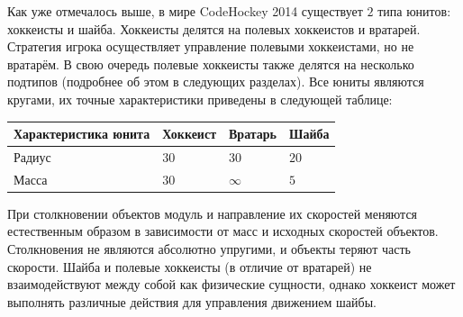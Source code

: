 Как уже отмечалось выше, в мире CodeHockey 2014 существует $2$ типа юнитов: хоккеисты и шайба. Хоккеисты делятся на полевых хоккеистов и
вратарей. Стратегия игрока осуществляет управление полевыми хоккеистами, но не вратарём. В свою очередь полевые хоккеисты также делятся на
несколько подтипов (подробнее об этом в следующих разделах). Все юниты являются кругами, их точные характеристики приведены в следующей
таблице:

\begin{tabular}{| l | l | l | l |}
  \hline
  Характеристика юнита & Хоккеист & Вратарь & Шайба \\
  \hline
  Радиус & $30$ & $30$ & $20$ \\
  Масса & $30$ & $\infty$ & $5$ \\
  \hline
\end{tabular}

При столкновении объектов модуль и направление их скоростей меняются естественным образом в зависимости от масс и исходных скоростей
объектов. Столкновения не являются абсолютно упругими, и объекты теряют часть скорости. Шайба и полевые хоккеисты (в отличие от вратарей)
не взаимодействуют между собой как физические сущности, однако хоккеист может выполнять различные действия для управления движением шайбы.

